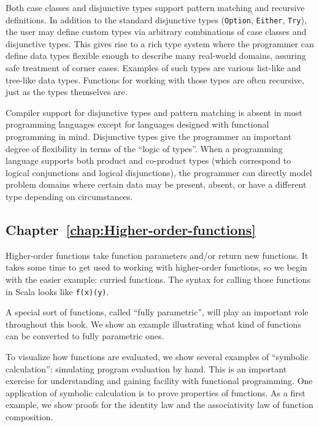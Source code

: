 Both case classes and disjunctive types support pattern matching and
recursive definitions. In addition to the standard disjunctive types
(\lstinline!Option!, \lstinline!Either!, \lstinline!Try!), the
user may define custom types via arbitrary combinations of case classes
and disjunctive types. This gives rise to a rich type system where
the programmer can define data types flexible enough to describe many
real-world domains, assuring safe treatment of corner cases. Examples
of such types are various list-like and tree-like data types. Functions
for working with those types are often recursive, just as the types
themselves are.

Compiler support for disjunctive types and pattern matching is absent
in most programming languages except for languages designed with functional
programming in mind. Disjunctive types give the programmer an important
degree of flexibility in terms of the \textsf{``}logic of types\textsf{''}. When a
programming language supports both product and co-product types (which
correspond to logical conjunctions and logical disjunctions), the
programmer can directly model problem domains where certain data may
be present, absent, or have a different type depending on circumstances.

\subsection{Chapter~\ref{chap:Higher-order-functions}}

Higher-order functions take function parameters and/or return new
functions. It takes some time to get used to working with higher-order
functions, so we begin with the easier example: curried functions.
The syntax for calling those functions in Scala looks like \lstinline!f(x)(y)!. 

A special sort of functions, called \textsf{``}fully parametric\textsf{''}, will play
an important role throughout this book. We show an example illustrating
what kind of functions can be converted to fully parametric ones. 

To visualize how functions are evaluated, we show several examples
of \textsf{``}symbolic calculation\textsf{''}: simulating program evaluation by hand.
This is an important exercise for understanding and gaining facility
with functional programming. One application of symbolic calculation
is to prove properties of functions. As a first example, we show proofs
for the identity law and the associativity law of function composition. 

